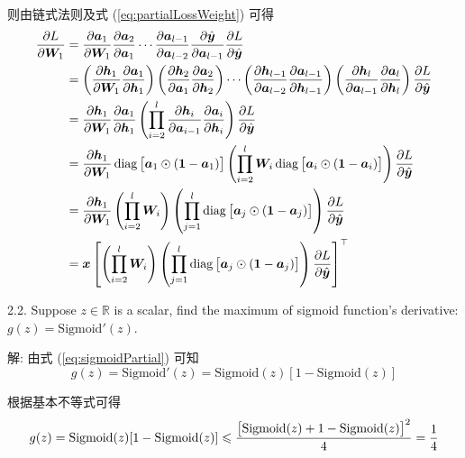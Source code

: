\documentclass{article}
\begin{document}
则由链式法则及式 (\ref{eq:partialLossWeight}) 可得
\begin{equation}
  \begin{aligned}
    \frac{\partial L}{\partial\bm{W}_1}
    &=\frac{\partial\bm{a}_1}{\partial\bm{W}_1}\frac{\partial\bm{a}_{2}}{\partial\bm{a}_{1}}\cdots\frac{\partial\bm{a}_{l-1}}{\partial\bm{a}_{l-2}}\frac{\partial\hat{\bm{y}}}{\partial\bm{a}_{l-1}}\frac{\partial L}{\partial\hat{\bm{y}}}\\
    &=\left(\frac{\partial\bm{h}_1}{\partial\bm{W}_1}
    \frac{\partial\bm{a}_{1}}{\partial\bm{h}_{1}}\right)
    \left(\frac{\partial\bm{h}_2}{\partial\bm{a}_1}
    \frac{\partial\bm{a}_{2}}{\partial\bm{h}_{2}}\right)
    \cdots
    \left(\frac{\partial\bm{h}_{l-1}}{\partial\bm{a}_{l-2}}
    \frac{\partial\bm{a}_{l-1}}{\partial\bm{h}_{l-1}}\right)
    \left(\frac{\partial\bm{h}_{l}}{\partial\bm{a}_{l-1}}
    \frac{\partial\bm{a}_l}{\partial\bm{h}_{l}}\right)
    \frac{\partial L}{\partial\hat{\bm{y}}}\\
    &=\frac{\partial\bm{h}_1}{\partial\bm{W}_1}
    \frac{\partial\bm{a}_{1}}{\partial\bm{h}_{1}}
    \left(\prod_{i=2}^l\frac{\partial\bm{h}_i}{\partial\bm{a}_{i-1}}
    \frac{\partial\bm{a}_{i}}{\partial\bm{h}_{i}}\right)
    \frac{\partial L}{\partial\hat{\bm{y}}}\\
    &=\frac{\partial\bm{h}_1}{\partial\bm{W}_1}
    \operatorname{diag}\big[\bm{a}_1\odot(\bm{1}-\bm{a}_1)\big]
    \left(\prod_{i=2}^l\bm{W}_i\operatorname{diag}\big[\bm{a}_i\odot(\bm{1}-\bm{a}_i)\big]\right)
    \frac{\partial L}{\partial\hat{\bm{y}}}\\
    &=\frac{\partial\bm{h}_1}{\partial\bm{W}_1}
    \left(\prod_{i=2}^l\bm{W}_i\right)\left(\prod_{j=1}^l\operatorname{diag}\big[\bm{a}_j\odot(\bm{1}-\bm{a}_j)\big]\right)
    \frac{\partial L}{\partial\hat{\bm{y}}}\\
    &=\bm{x}\left[\left(\prod_{i=2}^l\bm{W}_i\right)\left(\prod_{j=1}^l\operatorname{diag}\big[\bm{a}_j\odot(\bm{1}-\bm{a}_j)\big]\right)
    \frac{\partial L}{\partial\hat{\bm{y}}}\right]^\top\\
  \end{aligned}
\end{equation}

2.2. Suppose $z\in\mathbb R$ is a scalar, find the maximum of sigmoid function's derivative: $g(z)=\mathrm{Sigmoid}'(z)$.

解: 由式 (\ref{eq:sigmoidPartial}) 可知
\begin{equation}
  g(z)=\mathrm{Sigmoid}'(z)=\mathrm{Sigmoid}(z)[1-\mathrm{Sigmoid}(z)]
\end{equation}

根据基本不等式可得
\begin{equation}
  g(z)=\mathrm{Sigmoid}(z)[1-\mathrm{Sigmoid}(z)]\leqslant\frac{\big[\mathrm{Sigmoid}(z)+1-\mathrm{Sigmoid}(z)\big]^2}{4}=\frac{1}{4}
\end{equation}
\end{document}
